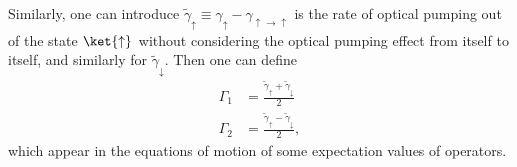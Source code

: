 \documentclass[]{report}
\begin{document}
Similarly, one can introduce $\tilde{\gamma}_\uparrow  \equiv \gamma_\uparrow - \gamma_{\uparrow \rightarrow \uparrow}$ is the rate of optical pumping out of the state $\ket{\uparrow}$ without considering the optical pumping effect from itself to itself, and similarly for $\tilde{\gamma}_\downarrow$. Then one can define 
\begin{align}
\Gamma_1 &= \frac{\tilde{\gamma}_\uparrow + \tilde{\gamma}_\downarrow}{2}\\
\Gamma_2 &= \frac{\tilde{\gamma}_\uparrow - \tilde{\gamma}_\downarrow}{2},
\end{align}
which appear in the equations of motion of some expectation values of operators.


\begin{figure}
\begin{minipage}{.5\linewidth}
\centering
{}
\end{minipage}
\begin{minipage}{.5\linewidth}
\centering
{}

\end{minipage}
\end{figure}
\end{document}
